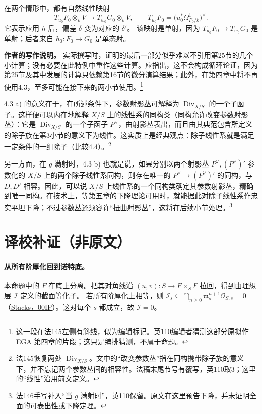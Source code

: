 \documentclass[openany,fontset=fandol]{ctexbook}
\DeclareMathOperator{\Div}{Div}
\newcommand{\OO}{\mathcal O}
\newcommand{\m}{\mathfrak m}
\begin{document}
在两个情形中，都有自然线性映射
\[
 T_{u_0}F_0\otimes_kV\longrightarrow T_{w_0}G_0\otimes_kV,
 \qquad T_{u_0}F_0=\bigl(u_0^*\Omega^1_{F_0/k}\bigr)^\vee .
\]
它表示应用 \(h\) 后，偏差 \(\delta\) 变为对应的 \(\delta'\)。
该映射是单射，因为 \(T_{u_0}F_0\to T_{w_0}G_0\) 是单射；后者来自 \(h_0:F_0\to G_0\) 是单态射。

\medskip\noindent\textbf{作者的写作说明。}
实际撰写时，证明的最后一部分似乎难以不引用第25节的几个小计算；没有必要在此特例中重作这些计算。应指出，这不会构成循环论证，因为第25节及其中发展的计算只依赖第16节的微分演算结果；此外，在第四章中将不再使用4.3，至多可能在接下来的两小节使用。\footnote{这一段在法145左侧有斜线，似为编辑标记。英110编辑者猜测这部分原拟作 EGA 第四章的片段；这只是编排猜测，不属于命题。}

4.3 a) 的意义在于，在所述条件下，参数射影丛可解释为 \(\Div_{X/S}\) 的一个子函子。这样便可以内在地解释 \(X/S\) 上的线性系的同构类（同构允许改变参数射影丛）：它是 \(\Div_{X/S}\) 的一个子函子 \(P^\vee\)，由射影丛表出，而且由其典范包含所定义的除子族在第3小节的意义下为线性。这实质上是经典观点：除子线性系就是满足一定条件的一组除子（比较4.4）。\footnote{法145恢复两处 \(\Div_{X/S}\)。文中的“改变参数丛”指在同构携带除子族的意义下，并不忘记两个参数丛间的相容性。法稿末尾节号有覆写，英110取3；这里的“线性”沿用前文定义。}

另一方面，在 \(g\) 满射时，4.3 b) 也就是说，如果分别以两个射影丛 \(P^\vee,(P^\vee)'\) 参数化的 \(X/S\) 上的两个除子线性系同构，则存在唯一的 \(P^\vee\to(P^\vee)'\) 的同构，与 \(D,D'\) 相容。因此，可以说 \(X/S\) 上线性系的一个同构类确定其参数射影丛，精确到唯一同构。在技术上，等第五章的下降理论可用时，就能据此对除子线性系作忠实平坦下降；不过参数丛还须容许“扭曲射影丛”，这将在后续小节处理。\footnote{法146手写补入“当 \(g\) 满射时”，英110保留。原文在这里预告下降，并未证明全面的可表出性或下降定理。}

\section*{译校补证（非原文）}
\paragraph{从所有阶厚化回到诺特底。}
本命题中的 \(F\) 在底上分离。把其对角线沿 \((u,v):S\to F\times_SF\) 拉回，得到由理想层 \(\mathcal I\) 定义的截面等化子。
若所有阶厚化上相等，则 \(\mathcal I_s\subseteq\bigcap_{n\geq0}\m_s^{n+1}\OO_{S,s}=0\)（\href{https://stacks.math.columbia.edu/tag/00IP}{Stacks，00IP}）。这对每个 \(s\) 都成立，故 \(\mathcal I=0\)。
\end{document}
